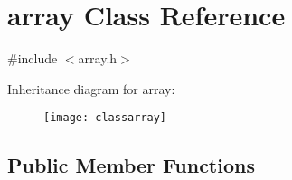 \hypertarget{classarray}{\section{array Class Reference}
\label{classarray}
}


{\ttfamily \#include $<$array.\-h$>$}

Inheritance diagram for array\-:\begin{figure}[H]
\begin{center}
\leavevmode
\texttt{[image: classarray]}
\end{center}
\end{figure}
\subsection*{Public Member Functions}
